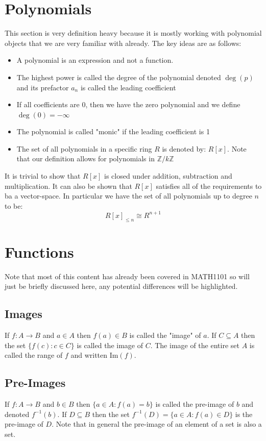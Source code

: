 \documentclass[12pt]{article}
\begin{document}
\section{Polynomials}
This section is very definition heavy because it is mostly working with polynomial objects that we are very familiar with already. The key ideas are as follows:
\begin{itemize}
    \item A polynomial is an expression and not a function.
    \item The highest power is called the degree of the polynomial denoted \(\deg(p)\) and its prefactor \(a_n\) is called the leading coefficient
    \item If all coefficients are 0, then we have the zero polynomial and we define \(\deg{(0)}=-\infty\)
    \item The polynomial is called "monic" if the leading coefficient is 1
    \item The set of all polynomials in a specific ring \(R\) is denoted by: \(R[x]\). Note that our definition allows for polynomials in \(\mathbb{Z}/k\mathbb{Z}\)
\end{itemize}
It is trivial to show that \(R[x]\) is closed under addition, subtraction and multiplication. It can also be shown that \(R[x]\) satisfies all of the requirements to ba a vector-space. In particular we have the set of all polynomials up to degree \(n\) to be:
\[R[x]_{\leq n}\cong R^{n+1}\]
\section{Functions}
Note that most of this content has already been covered in MATH1101 so will just be briefly discussed here, any potential differences will be highlighted.
\subsection*{Images}
If \(f:A\to B\) and \(a\in A\) then \(f(a)\in B\) is called the "image" of \(a\). If \(C\subseteq A\) then the set \(\{f(c):c\in C\}\) is called the image of \(C\). The image of the entire set \(A\) is called the range of \(f\) and written \(\text{Im}(f)\).  
\subsection*{Pre-Images}
If \(f:A\to B\) and \(b\in B\) then \(\{a\in A: f(a)=b\}\) is called the pre-image of \(b\) and denoted \(f^{-1}(b)\). If \(D\subseteq B\) then the set \(f^{-1}(D)=\{a\in A: f(a)\in D\}\) is the pre-image of \(D\). Note that in general the pre-image of an element of a set is also a set.
\end{document}
